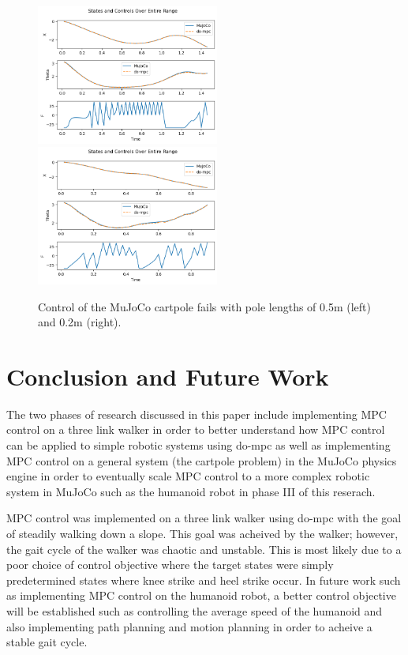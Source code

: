 \documentclass{./springer/svjour3}
\begin{document}
\begin{figure}[!h]
  \centering
  \includegraphics[width=6cm]{./figures/cartpole_mjpc_times_0.5.png} %
  \includegraphics[width=6cm]{./figures/cartpole_mjpc_times_0.2.png} %
  \caption{Control of the MuJoCo cartpole fails with pole lengths of 0.5m (left) and 0.2m (right).}
  \label{fig:cartpole_fail}
\end{figure}

\section{Conclusion and Future Work}
The two phases of research discussed in this paper include implementing MPC control on a three link walker in order to 
better understand how MPC control can be applied to simple robotic systems using do-mpc as well as 
implementing MPC control on a general system (the cartpole problem) in the MuJoCo physics engine in order to eventually scale MPC control to a more 
complex robotic system in MuJoCo such as the humanoid robot in phase III of this reserach. 

MPC control was implemented on a three link walker using do-mpc with the goal of steadily walking down a slope. This goal was acheived by the walker; however,
the gait cycle of the walker was chaotic and unstable. This is most likely due to a poor choice of control objective where the target states were simply predetermined 
states where knee strike and heel strike occur. In future work such as implementing MPC control on the humanoid robot, a better control objective will be established such as 
controlling the average speed of the humanoid and also implementing path planning and motion planning in order to acheive a stable gait cycle.
\end{document}
